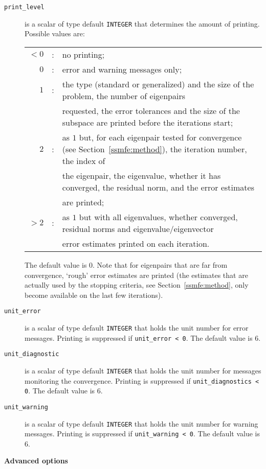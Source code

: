 \begin{description}
%
\item[\texttt{print\_level}] is a scalar of type default \texttt{INTEGER} that
determines the amount of printing.
Possible values are:\\
%
\begin{tabular}{rcl}
$<0$ &:& no printing;\\
$0$ &:& error and warning messages only;\\
$1$ &:& the type (standard or generalized) and the size of the problem,
the number of eigenpairs \\ 
& & requested, the error tolerances and
the size of the subspace are printed before the iterations start;\\
$2$ &:& as $1$ but, for each eigenpair tested for convergence
(see Section~\ref{ssmfe:method}), the iteration number,
the index of \\
& & 
the eigenpair, the
eigenvalue, whether it has converged, the residual norm, and the error
estimates \\
& & are printed;\\
$>2$ &:& as $1$ but with all eigenvalues, whether converged, residual norms
and eigenvalue/eigenvector\\ 
& & error estimates printed on each iteration. 
\end{tabular}

\noindent
The default value is 0. 
Note that for eigenpairs that are far from convergence,
`rough' error estimates are printed
(the estimates that are actually used by the stopping criteria,
see Section~\ref{ssmfe:method}, only become available on the last few
iterations).
%
\item[\texttt{unit\_error}] is a scalar of type default \texttt{INTEGER} that
holds the unit number for error messages.
Printing is suppressed if {\tt unit\_error < 0}.
The default value is 6. 
%
\item[\texttt{unit\_diagnostic}] is a scalar of type default \texttt{INTEGER} that
holds the unit number for messages monitoring the convergence.
Printing is suppressed if {\tt unit\_diagnostics < 0}.
The default value is 6. 
%
\item[\texttt{unit\_warning}] is a scalar of type default \texttt{INTEGER} that
holds the unit number for warning messages.
Printing is suppressed if {\tt unit\_warning < 0}.
The default value is 6. 
%
\end{description}

\medskip
\noindent
{\bf Advanced options}

